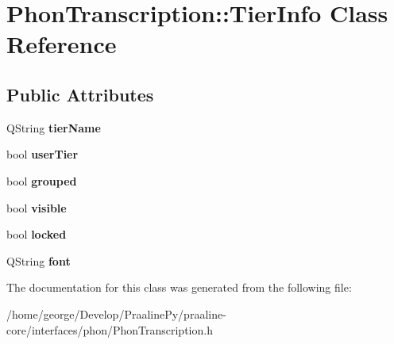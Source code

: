 \hypertarget{class_phon_transcription_1_1_tier_info}{}\section{Phon\+Transcription\+:\+:Tier\+Info Class Reference}
\label{class_phon_transcription_1_1_tier_info}
\subsection*{Public Attributes}
\begin{DoxyCompactItemize}
\item 
\mbox{\label{class_phon_transcription_1_1_tier_info_a106a2c5d0b5a8752be25b93d26e231fd}} 
Q\+String {\bfseries tier\+Name}
\item 
\mbox{\label{class_phon_transcription_1_1_tier_info_a0bfef8b56ced010a21001d770ab24f2b}} 
bool {\bfseries user\+Tier}
\item 
\mbox{\label{class_phon_transcription_1_1_tier_info_a4258185d84868540bcc6bcaaf052ae2e}} 
bool {\bfseries grouped}
\item 
\mbox{\label{class_phon_transcription_1_1_tier_info_a0868fb154b8c7c547da37bffcce6ae56}} 
bool {\bfseries visible}
\item 
\mbox{\label{class_phon_transcription_1_1_tier_info_a01ee9fc3c15b32951d2e3a0f57eb2780}} 
bool {\bfseries locked}
\item 
\mbox{\label{class_phon_transcription_1_1_tier_info_adde971a12ff069d40d7923852b00c580}} 
Q\+String {\bfseries font}
\end{DoxyCompactItemize}


The documentation for this class was generated from the following file\+:\begin{DoxyCompactItemize}
\item 
/home/george/\+Develop/\+Praaline\+Py/praaline-\/core/interfaces/phon/Phon\+Transcription.\+h\end{DoxyCompactItemize}
